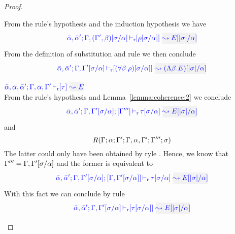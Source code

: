 \begin{proof}
\begin{description}
From the rule's hypothesis and the induction hypothesis we have
\begin{equation*}
\drres{\bar{\alpha},\bar{\alpha}'}{\tenv,(\tenv',\beta)[\suty/\alpha]}{\rulet[\suty/\alpha]}{E[|\suty|/\alpha]}
\end{equation*}
From the definition of substitution and rule  we then conclude
\begin{equation*}
\drres{\bar{\alpha},\bar{\alpha}'}{\tenv,\tenv'[\suty/\alpha]}{(\tall{\beta}{\rulet})[\suty/\alpha]}{(\Abs{\beta}{E})[|\suty|/\alpha]}
\end{equation*}
\item[\fbox{\rref{R-Simp}}]\quad$\drres{\bar{\alpha},\alpha,\bar{\alpha}'}{\tenv,\alpha,\tenv'}{\type}{E}$ \\

From the rule's hypothesis and Lemma~\ref{lemma:coherence:2} we conclude
\begin{equation*}
\dlres{\bar{\alpha},\bar{\alpha}'}{\tenv,\tenv'[\suty/\alpha]}{\tenv'''}{\type[\suty/\alpha]}{E[|\suty|/\alpha]}
\end{equation*}
  and
\begin{equation*}
  R(\Gamma;\alpha;\Gamma';\Gamma,\alpha,\Gamma';\Gamma''';\sigma)
\end{equation*}
  The latter could only have been obtained by ryle . 
  Hence, we know that $\Gamma''' = \Gamma,\Gamma'[\sigma/\alpha]$ and the former is equivalent to
\begin{equation*}
\dlres{\bar{\alpha},\bar{\alpha}'}{\tenv,\tenv'[\suty/\alpha]}{\tenv,\tenv'[\suty/\alpha]}{\type[\suty/\alpha]}{E[|\suty|/\alpha]}
\end{equation*}
With this fact we can conclude by rule 
\begin{equation*}
\drres{\bar{\alpha},\bar{\alpha}'}{\tenv,\tenv'[\suty/\alpha]}{\type[\suty/\alpha]}{E[|\suty|/\alpha]}
\end{equation*}
\end{description}
\end{proof}

